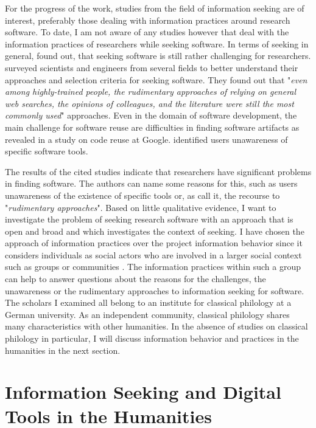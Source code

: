\documentclass[12pt, a4paper, titlepage, oneside, abstract=true, toc=listof, toc=bibliography, BCOR=1cm]{scrreprt}
\begin{document}
For the progress of the work, studies from the field of information seeking are of interest, preferably those dealing with information practices around research software.
To date, I am not aware of any studies however that deal with the information practices of researchers while seeking software. In terms of seeking in general, \citet{Howison2015} found out, that seeking software is still rather challenging for researchers. \citet{Hucka2018} surveyed scientists and engineers from several fields to better understand their approaches and selection criteria for seeking software. They found out that "\textit{even among highly-trained people, the rudimentary approaches of relying on general web searches, the opinions of colleagues, and the literature were still the most commonly used}" approaches. Even in the domain of software development, the main challenge for software reuse are difficulties in finding software artifacts as \citet{Bauer2014} revealed in a study on code reuse at Google. \citet{Grossman2009} identified users unawareness of specific software tools. 

The results of the cited studies indicate that researchers have significant problems in finding software. The authors can name some reasons for this, such as users unawareness of the existence of specific tools or, as \citep[p. 171]{Hucka2018} call it, the recourse to "\textit{rudimentary approaches}". Based on little qualitative evidence, I want to investigate the problem of seeking research software with an approach that is open and broad and which investigates the context of seeking. I have chosen the approach of information practices over the project information behavior since it considers individuals as social actors who are involved in a larger social context such as groups or communities \citep[p. 120]{Savolainen2007}. The information practices within such a group can help to answer questions about the reasons for the challenges, the unawareness or the rudimentary approaches to information seeking for software. The scholars I examined all belong to an institute for classical philology at a German university. As an independent community, classical philology shares many characteristics with other humanities. In the absence of studies on classical philology in particular, I will discuss information behavior and practices in the humanities in the next section.

\section{Information Seeking and Digital Tools in the Humanities}
\label{sec:Humanities}
\end{document}
